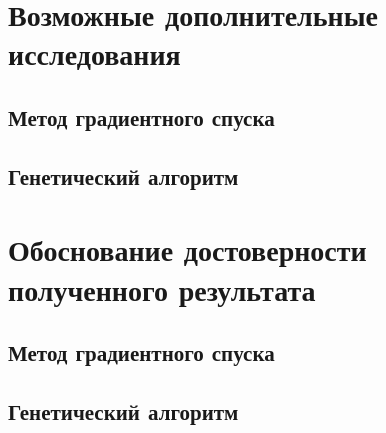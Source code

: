 \documentclass[10pt,a4paper,titlepage]{article}
\begin{document}
\section{Возможные дополнительные исследования}
\subsection{Метод градиентного спуска}

\subsection{Генетический алгоритм}

\section{Обоснование достоверности полученного результата}
\subsection{Метод градиентного спуска}

\subsection{Генетический алгоритм}
\end{document}

